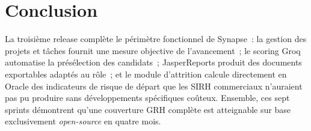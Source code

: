 \section{Conclusion}

La troisième release complète le périmètre fonctionnel de Synapse~: la gestion
des projets et tâches fournit une mesure objective de l'avancement~; le scoring
Groq automatise la présélection des candidats~; JasperReports produit des documents
exportables adaptés au rôle~; et le module d'attrition calcule directement en Oracle
des indicateurs de risque de départ que les SIRH commerciaux n'auraient pas pu
produire sans développements spécifiques coûteux. Ensemble, ces sept sprints
démontrent qu'une couverture GRH complète est atteignable sur base
exclusivement \textit{open-source} en quatre mois.
